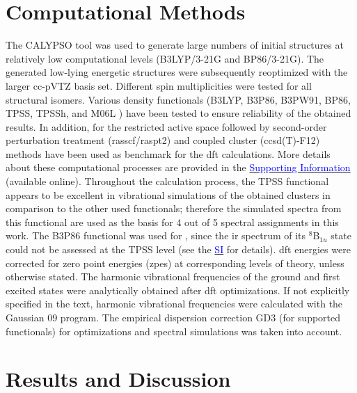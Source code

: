 \begin{refsection}
\section{Computational Methods}

The CALYPSO\cite{CALYPSO} tool was used to generate large numbers of initial structures at relatively low computational levels (B3LYP/3-21G and BP86/3-21G). The generated low-lying energetic structures were subsequently reoptimized with the larger cc-pVTZ basis set. \cite{basis-augM, basis-ccO} Different spin multiplicities were tested for all structural isomers. Various density functionals (B3LYP, \cite{lyp, b3lyp2, b3} B3P86, \cite{b3,p86} B3PW91, \cite{b3} BP86, \cite{b3lyp2, p86} TPSS, \cite{tpss} TPSSh, and M06L \cite{m06l}) have been tested to ensure reliability of the obtained results. In addition, for  the restricted active space followed by second-order perturbation treatment (\acrshort{rasscf}/\acrshort{raspt2}) and coupled cluster (\acrshort{ccsd}(T)-F12) methods have been used as benchmark for the \acrshort{dft} calculations. More details about these computational processes are provided in the \href{https://pubs.acs.org/doi/suppl/10.1021/acs.jpcc.8b10035/suppl_file/jp8b10035_si_002.pdf}{\textcolor{blue}{Supporting Information}} (available online). Throughout the calculation process, the TPSS functional appears to be excellent in vibrational simulations of the obtained clusters in comparison to the other used functionals; therefore the simulated spectra from this functional are used as the basis for 4 out of 5 spectral assignments in this work. The B3P86 functional was used for , since the \acrshort{ir} spectrum of its $^8$B$_{1u}$ state could not be assessed at the TPSS level (see the \href{https://pubs.acs.org/doi/suppl/10.1021/acs.jpcc.8b10035/suppl_file/jp8b10035_si_002.pdf}{\textcolor{blue}{SI}} for details). \acrshort{dft} energies were corrected for zero point energies (\acrshort{zpe}s) at corresponding levels of theory, unless otherwise stated. The harmonic vibrational frequencies of the ground and first excited states were analytically obtained after \acrshort{dft} optimizations. If not explicitly specified in the text, harmonic vibrational frequencies were calculated with the Gaussian 09 program.\cite{g09} The empirical dispersion correction GD3 \cite{GD3} (for supported functionals) for optimizations and spectral simulations was taken into account.

  

\section{Results and Discussion}



\end{refsection}
